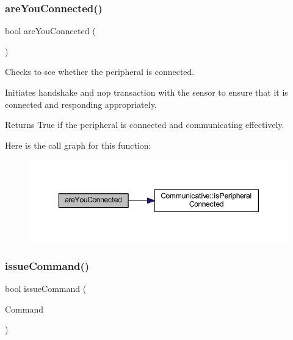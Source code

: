 \subsubsection{\texorpdfstring{areYouConnected()}{areYouConnected()}}
{\footnotesize\ttfamily bool are\+You\+Connected (\begin{DoxyParamCaption}\item[{void}]{ }\end{DoxyParamCaption})}



Checks to see whether the peripheral is connected. 

Initiates handshake and nop transaction with the sensor to ensure that it is connected and responding appropriately. \begin{DoxyReturn}{Returns}
True if the peripheral is connected and communicating effectively. 
\end{DoxyReturn}
Here is the call graph for this function\+:
\nopagebreak
\begin{figure}[H]
\begin{center}
\leavevmode
\includegraphics[width=350pt]{class_instructable_a2bdcc11cead0067e963c524968d0d3e1_cgraph}
\end{center}
\end{figure}
\mbox{\label{class_instructable_a26afb4fb25fe8a13e268544d0850fe3f}} 
\subsubsection{\texorpdfstring{issueCommand()}{issueCommand()}\hspace{0.1cm}{\footnotesize\ttfamily [1/4]}}
{\footnotesize\ttfamily bool issue\+Command (\begin{DoxyParamCaption}\item[{\mbox{\hyperlink{_s_p_i___instruction_set_8h_afefab269eb3692ecb3e5fcdbb9440792}{m\+Instruct}}}]{Command }\end{DoxyParamCaption})}



